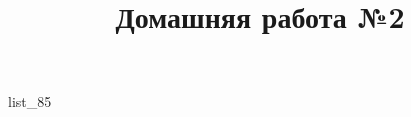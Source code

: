 \documentclass[12pt, a4paper]{article}
\begin{document}
	\title{Домашняя работа №2}
	{list_85}
\end{document}
